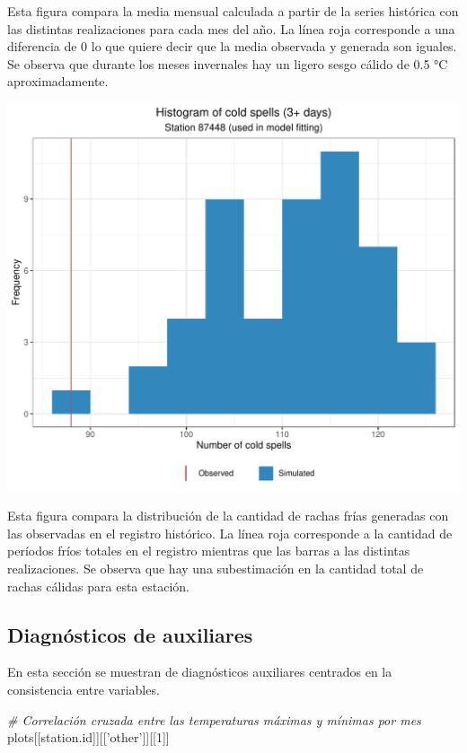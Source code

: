 \documentclass[
]{article}
\newenvironment{Shaded}{}{}
\newcommand{\CommentTok}[1]{\textcolor[rgb]{0.38,0.63,0.69}{\textit{#1}}}
\newcommand{\DecValTok}[1]{\textcolor[rgb]{0.25,0.63,0.44}{#1}}
\newcommand{\NormalTok}[1]{#1}
\newcommand{\StringTok}[1]{\textcolor[rgb]{0.25,0.44,0.63}{#1}}
\begin{document}
Esta figura compara la media mensual calculada a partir de la series histórica con las distintas realizaciones para cada mes del año. La línea roja corresponde a una diferencia de 0 lo que quiere decir que la media observada y generada son iguales. Se observa que durante los meses invernales hay un ligero sesgo cálido de 0.5 °C aproximadamente.

\begin{center}\includegraphics{Webinario_Generador_files/figure-latex/unnamed-chunk-55-1} \end{center}

Esta figura compara la distribución de la cantidad de rachas frías generadas con las observadas en el registro histórico. La línea roja corresponde a la cantidad de períodos fríos totales en el registro mientras que las barras a las distintas realizaciones. Se observa que hay una subestimación en la cantidad total de rachas cálidas para esta estación.

\hypertarget{diagnuxf3sticos-de-auxiliares}{%
\subsection{Diagnósticos de auxiliares}\label{diagnuxf3sticos-de-auxiliares}}

En esta sección se muestran de diagnósticos auxiliares centrados en la consistencia entre variables.

\begin{Shaded}
\begin{Highlighting}[]
\CommentTok{# Correlación cruzada entre las temperaturas máximas y mínimas por mes}
\NormalTok{plots[[station.id]][[}\StringTok{'other'}\NormalTok{]][[}\DecValTok{1}\NormalTok{]]}
\end{Highlighting}
\end{Shaded}
\end{document}
